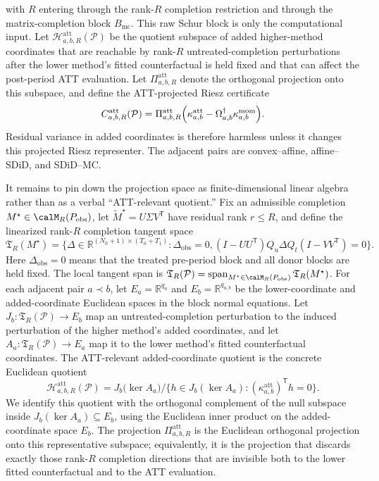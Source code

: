 \documentclass[11pt]{article}
\newcommand{\transpose}{\mathsf{T}}
\newcommand{\calH}{\mathcal{H}}
\newcommand{\R}{\mathbb{R}}
\theoremstyle{definition}
\theoremstyle{plain}
\theoremstyle{remark}
\begin{document}
with \(R\) entering through the rank-\(R\) completion restriction and through the matrix-completion block \(B_{\mathrm{mc}}\). This raw Schur block is only the computational input. Let \(\calH^{\mathrm{att}}_{a,b,R}(\mathcal P)\) be the quotient subspace of added higher-method coordinates that are reachable by rank-\(R\) untreated-completion perturbations after the lower method's fitted counterfactual is held fixed and that can affect the post-period ATT evaluation. Let \(\Pi^{\mathrm{att}}_{a,b,R}\) denote the orthogonal projection onto this subspace, and define the ATT-projected Riesz certificate
\[
C^{\mathrm{att}}_{a,b,R}(\mathcal P)
=\Pi^{\mathrm{att}}_{a,b,R}
\Bigl(\kappa^{\mathrm{att}}_{a,b}-\Omega_{a,b}^{\dagger}\kappa^{\mathrm{mom}}_{a,b}\Bigr).
\]
Residual variance in added coordinates is therefore harmless unless it changes this projected Riesz representer. The adjacent pairs are convex--affine, affine--SDiD, and SDiD--MC.

It remains to pin down the projection space as finite-dimensional linear algebra rather than as a verbal ``ATT-relevant quotient.'' Fix an admissible completion \(M^\star\in\calM_R(P_{\mathrm{obs}})\), let \(\widetilde M^\star=U\Sigma V^\transpose\) have residual rank \(r\le R\), and define the linearized rank-\(R\) completion tangent space
\[
\mathfrak T_R(M^\star)=\{\Delta\in\R^{(N_0+1)\times(T_0+T_1)}:
\Delta_{\mathrm{obs}}=0,
(I-UU^\transpose)Q_u\Delta Q_t(I-VV^\transpose)=0\}.
\]
Here \(\Delta_{\mathrm{obs}}=0\) means that the treated pre-period block and all donor blocks are held fixed. The local tangent span is \(\mathfrak T_R(\mathcal P)=\operatorname{span}_{M^\star\in\calM_R(P_{\mathrm{obs}})}\mathfrak T_R(M^\star)\). For each adjacent pair \(a\prec b\), let \(E_a=\R^{q_a}\) and \(E_b=\R^{q_{a,b}}\) be the lower-coordinate and added-coordinate Euclidean spaces in the block normal equations. Let \(J_b:\mathfrak T_R(\mathcal P)\to E_b\) map an untreated-completion perturbation to the induced perturbation of the higher method's added coordinates, and let \(A_a:\mathfrak T_R(\mathcal P)\to E_a\) map it to the lower method's fitted counterfactual coordinates. The ATT-relevant added-coordinate quotient is the concrete Euclidean quotient
\[
\calH^{\mathrm{att}}_{a,b,R}(\mathcal P)
=J_b\bigl(\ker A_a\bigr)\big/
\{h\in J_b(\ker A_a):(\kappa^{\mathrm{att}}_{a,b})^\transpose h=0\}.
\]
We identify this quotient with the orthogonal complement of the null subspace inside \(J_b(\ker A_a)\subseteq E_b\), using the Euclidean inner product on the added-coordinate space \(E_b\). The projection \(\Pi^{\mathrm{att}}_{a,b,R}\) is the Euclidean orthogonal projection onto this representative subspace; equivalently, it is the projection that discards exactly those rank-\(R\) completion directions that are invisible both to the lower fitted counterfactual and to the ATT evaluation.
\end{document}
